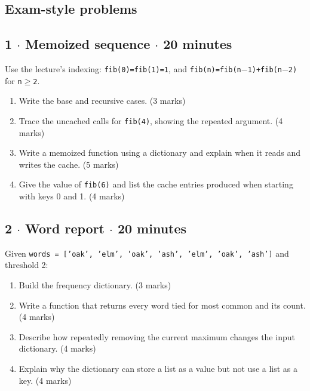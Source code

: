 \documentclass[11pt]{article}
\begin{document}
\begin{keepsection}
\section{Exam-style problems}

\begin{keepsection}
\subsection{1 \ensuremath{\cdot} Memoized sequence \ensuremath{\cdot} 20 minutes}

Use the lecture’s indexing: \texttt{fib(0)=fib(1)=1}, and \texttt{fib(n)=fib(n\ensuremath{-}1)+fib(n\ensuremath{-}2)} for \texttt{n\ensuremath{\geq}2}.

\begin{enumerate}
\item Write the base and recursive cases. (3 marks)
\item Trace the uncached calls for \texttt{fib(4)}, showing the repeated argument. (4 marks)
\item Write a memoized function using a dictionary and explain when it reads and writes the cache. (5 marks)
\item Give the value of \texttt{fib(6)} and list the cache entries produced when starting with keys 0 and 1. (4 marks)
\end{enumerate}

\end{keepsection}

\begin{keepsection}
\subsection{2 \ensuremath{\cdot} Word report \ensuremath{\cdot} 20 minutes}

Given \texttt{words = ['oak', 'elm', 'oak', 'ash', 'elm', 'oak', 'ash']} and threshold 2:

\begin{enumerate}
\item Build the frequency dictionary. (3 marks)
\item Write a function that returns every word tied for most common and its count. (4 marks)
\item Describe how repeatedly removing the current maximum changes the input dictionary. (4 marks)
\item Explain why the dictionary can store a list as a value but not use a list as a key. (4 marks)
\end{enumerate}

\end{keepsection}
\end{keepsection}
\end{document}
